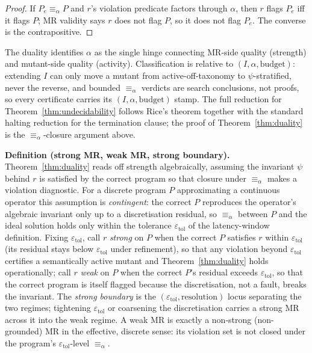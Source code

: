 \documentclass[manuscript,screen,review]{acmart}
\begin{document}
\begin{proof}
If $P_e \equiv_\alpha P$ and $r$'s
violation predicate factors through $\alpha$, then $r$ flags $P_e$ iff
it flags $P$; MR validity says $r$ does not flag $P$, so it does not
flag $P_e$. The converse is the contrapositive.
\end{proof}

The duality identifies $\alpha$ as the single hinge connecting MR-side
quality (strength) and mutant-side quality (activity). Classification
is relative to $(I, \alpha, \text{budget})$: extending $I$ can only move
a mutant from active-off-taxonomy to $\psi$-stratified, never the
reverse, and bounded $\equiv_\alpha$ verdicts are search conclusions,
not proofs, so every certificate carries its $(I, \alpha, \text{budget})$
stamp. The full reduction for Theorem~\ref{thm:undecidability} follows Rice's theorem together
with the standard halting reduction for the termination clause; the
proof of Theorem~\ref{thm:duality} is the $\equiv_\alpha$-closure argument above.

\textbf{Definition (strong MR, weak MR, strong boundary).} Theorem~\ref{thm:duality}
reads off strength algebraically, assuming the invariant $\psi$ behind
$r$ is satisfied by the correct program so that closure under
$\equiv_\alpha$ makes a violation diagnostic. For a discrete program $P$
approximating a continuous operator this assumption is \emph{contingent}:
the correct $P$ reproduces the operator's algebraic invariant only up to
a discretisation residual, so $\equiv_\alpha$ between $P$ and the ideal
solution holds only within the tolerance $\varepsilon_{\mathrm{tol}}$ of
the latency-window definition. Fixing $\varepsilon_{\mathrm{tol}}$, call
$r$ \emph{strong} on $P$ when the correct $P$ satisfies $r$ within
$\varepsilon_{\mathrm{tol}}$ (its residual stays below
$\varepsilon_{\mathrm{tol}}$ under refinement), so that any violation
beyond $\varepsilon_{\mathrm{tol}}$ certifies a semantically active
mutant and Theorem~\ref{thm:duality} holds operationally; call $r$ \emph{weak} on $P$
when the correct $P$'s residual exceeds $\varepsilon_{\mathrm{tol}}$, so
that the correct program is itself flagged because the discretisation,
not a fault, breaks the invariant. The \emph{strong boundary} is the
$(\varepsilon_{\mathrm{tol}}, \text{resolution})$ locus separating the
two regimes; tightening $\varepsilon_{\mathrm{tol}}$ or coarsening the
discretisation carries a strong MR across it into the weak regime. A weak
MR is exactly a non-strong (non-grounded) MR in the effective, discrete
sense: its violation set is not closed under the program's
$\varepsilon_{\mathrm{tol}}$-level $\equiv_\alpha$.
\end{document}

